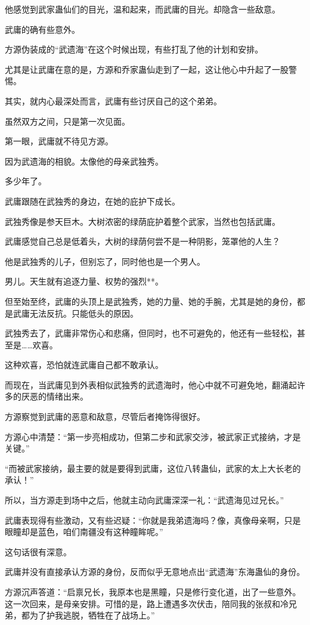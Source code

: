 \begin{this_body}
他感觉到武家蛊仙们的目光，温和起来，而武庸的目光。却隐含一些敌意。

武庸的确有些意外。

方源伪装成的“武遗海”在这个时候出现，有些打乱了他的计划和安排。

尤其是让武庸在意的是，方源和乔家蛊仙走到了一起，这让他心中升起了一股警惕。

其实，就内心最深处而言，武庸有些讨厌自己的这个弟弟。

虽然双方之间，只是第一次见面。

第一眼，武庸就不待见方源。

因为武遗海的相貌。太像他的母亲武独秀。

多少年了。

武庸跟随在武独秀的身边，在她的庇护下成长。

武独秀像是参天巨木。大树浓密的绿荫庇护着整个武家，当然也包括武庸。

武庸感觉自己总是低着头，大树的绿荫何尝不是一种阴影，笼罩他的人生？

他是武独秀的儿子，但别忘了，同时他也是一个男人。

男儿。天生就有追逐力量、权势的强烈**。

但至始至终，武庸的头顶上是武独秀，她的力量、她的手腕，尤其是她的身份，都是武庸无法反抗。只能低头的原因。

武独秀去了，武庸非常伤心和悲痛，但同时，也不可避免的，他还有一些轻松，甚至是……欢喜。

这种欢喜，恐怕就连武庸自己都不敢承认。

而现在，当武庸见到外表相似武独秀的武遗海时，他心中就不可避免地，翻涌起许多的厌恶的情绪出来。

方源察觉到武庸的恶意和敌意，尽管后者掩饰得很好。

方源心中清楚：“第一步亮相成功，但第二步和武家交涉，被武家正式接纳，才是关键。”

“而被武家接纳，最主要的就是要得到武庸，这位八转蛊仙，武家的太上大长老的承认！”

所以，当方源走到场中之后，他就主动向武庸深深一礼：“武遗海见过兄长。”

武庸表现得有些激动，又有些迟疑：“你就是我弟遗海吗？像，真像母亲啊，只是眼瞳却是蓝色，咱们南疆没有这种瞳眸呢。”

这句话很有深意。

武庸并没有直接承认方源的身份，反而似乎无意地点出“武遗海”东海蛊仙的身份。

方源沉声答道：“启禀兄长，我原本也是黑瞳，只是修行变化道，出了一些意外。这一次回来，是母亲安排。可惜的是，路上遭遇多次伏击，陪同我的张叔和冷兄弟，都为了护我逃脱，牺牲在了战场上。”


\end{this_body}
